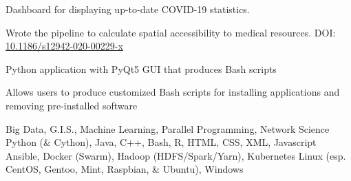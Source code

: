 \documentclass{acmresume}
\begin{document}
		\begin{titemize}
			\item Dashboard for displaying up-to-date COVID-19 statistics.
			\item Wrote the pipeline to calculate spatial accessibility to medical resources. DOI: \href{https://doi.org/10.1186/s12942-020-00229-x}{10.1186/s12942-020-00229-x}
		\end{titemize}
	
        \begin{titemize}
            \item Python application with PyQt5 GUI that produces Bash scripts
            \item Allows users to produce customized Bash scripts for installing applications and removing pre-installed software
        \end{titemize}
    
    
        \begin{description}[topsep=1pt,itemsep=1pt]
             Big Data, G.I.S., Machine Learning, Parallel Programming, Network Science
             Python (\& Cython), Java, C++, Bash, R, HTML, CSS, XML, Javascript
             Ansible, Docker (Swarm), Hadoop (HDFS/Spark/Yarn), Kubernetes
             Linux (esp. CentOS, Gentoo, Mint, Raspbian, \& Ubuntu), Windows
        \end{description}

	
\end{document}
